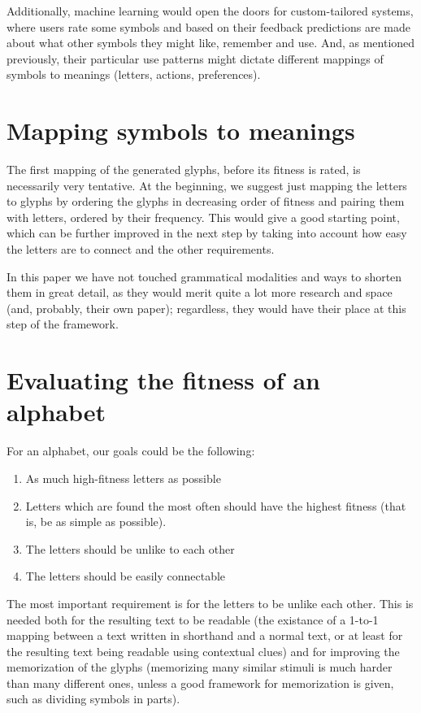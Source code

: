 \documentclass[conference]{IEEEtran}
\begin{document}
Additionally, machine learning would open the doors for custom-tailored systems, where users rate some symbols and based on their feedback predictions are made about what other symbols they might like, remember and use. And, as mentioned previously, their particular use patterns might dictate different mappings of symbols to meanings (letters, actions, preferences). 
\section{Mapping symbols to meanings}
The first mapping of the generated glyphs, before its fitness is rated, is necessarily very tentative. At the beginning, we suggest just mapping the letters to glyphs by ordering the glyphs in decreasing order of fitness and pairing them with letters, ordered by their frequency. This would give a good starting point, which can be further improved in the next step by taking into account how easy the letters are to connect and the other requirements. 

In this paper we have not touched grammatical modalities and ways to shorten them in great detail, as they would merit quite a lot more research and space (and, probably, their own paper); regardless, they would have their place at this step of the framework. 
\section{Evaluating the fitness of an alphabet}
For an alphabet, our goals could be the following:
\begin{enumerate}
        \item As much high-fitness letters as possible
        \item Letters which are found the most often should have the highest fitness (that is, be as simple as possible).
        \item The letters should be unlike to each other
        \item The letters should be easily connectable
\end{enumerate}

The most important requirement is for the letters to be unlike each other. This is needed both for the resulting text to be readable (the existance of a 1-to-1 mapping between a text written in shorthand and a normal text, or at least for the resulting text being readable using contextual clues) and for improving the memorization of the glyphs (memorizing many similar stimuli is much harder than many different ones, unless a good framework for memorization is given, such as dividing symbols in parts). 
\end{document}

